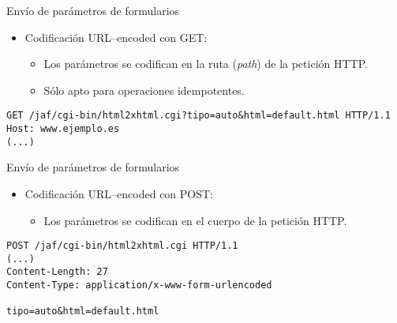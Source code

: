 \begin{slide}{Envío de parámetros de formularios}
  \begin{itemize}
  \item Codificación URL--encoded con GET:
    \begin{itemize}
    \item Los parámetros se codifican en la ruta (\emph{path})
      de la petición HTTP.
    \item Sólo apto para operaciones idempotentes.
    \end{itemize}
  \end{itemize}

\begin{Verbatim}[fontfamily=tt,fontsize=\fontsize{8}{8}]
GET /jaf/cgi-bin/html2xhtml.cgi?tipo=auto&html=default.html HTTP/1.1
Host: www.ejemplo.es
(...)
\end{Verbatim}


\end{slide}

\begin{slide}{Envío de parámetros de formularios}
  \begin{itemize}
  \item Codificación URL--encoded con POST:
    \begin{itemize}
    \item Los parámetros se codifican en el cuerpo
      de la petición HTTP.
    \end{itemize}
  \end{itemize}

\begin{Verbatim}[fontfamily=tt,fontsize=\fontsize{8}{8}]
POST /jaf/cgi-bin/html2xhtml.cgi HTTP/1.1
(...)
Content-Length: 27
Content-Type: application/x-www-form-urlencoded

tipo=auto&html=default.html
\end{Verbatim}


\end{slide}


